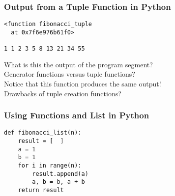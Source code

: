 \documentclass[14pt,aspectratio=169]{beamer}
\begin{document}
%
\begin{frame}[fragile]
  \frametitle{Output from a Tuple Function in Python}
  \normalsize
  \begin{minipage}{6in}
    \vspace*{.1in}
    \begin{verbatim}
<function fibonacci_tuple
  at 0x7f6e976b61f0>

1 1 2 3 5 8 13 21 34 55

    \end{verbatim}
  \vspace*{.35in}
  \begin{minipage}{5.2in}
  \begin{center}
    \normalsize \noindent What is this the output of the program segment? \\
    \normalsize \noindent Generator functions versus tuple functions? \\
    \normalsize \noindent Notice that this function produces the same output! \\
    \normalsize \noindent Drawbacks of tuple creation functions? \\
  \end{center}
  \end{minipage}
  \end{minipage}
\end{frame}

%
\begin{frame}[fragile]
  \frametitle{Using Functions and List in Python}
  \normalsize
  \begin{minipage}{6in}
    \vspace*{.1in}
    \begin{verbatim}
def fibonacci_list(n):
    result = [  ]
    a = 1
    b = 1
    for i in range(n):
        result.append(a)
        a, b = b, a + b
    return result
    \end{verbatim}
  \end{minipage}
\end{frame}
\end{document}
